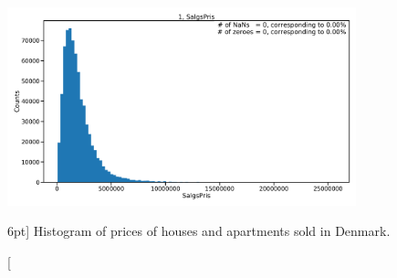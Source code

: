 \documentclass[a4paper, twoside, nobib]{tufte-book}
\begin{document}
\begin{figure}
  \includegraphics[width=0.9\textwidth, page=2]{figures/housing/overview_fig.pdf}
  \caption[Histogram of prices of houses and apartments sold in Denmark][6pt]
          {Histogram of prices of houses and apartments sold in Denmark.}
  \label{fig:h:price_overview}
\end{figure}
\end{document}
